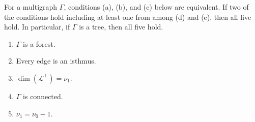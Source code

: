 For a multigraph $\Gamma$, conditions (a), (b), and (c) below are equivalent. If two of the conditions hold including at least one from among (d) and (e), then all five hold. In particular, if $\Gamma$ is a tree, then all five hold.
\begin{enumerate}
\item[(a)] $\Gamma$ is a forest.
\item[(b)] Every edge is an isthmus.
\item[(c)] $\dim(\mathcal{L}^\perp) = \nu_1$.
\item[(d)] $\Gamma$ is connected.
\item[(e)] $\nu_1 = \nu_0 - 1$.
\end{enumerate}